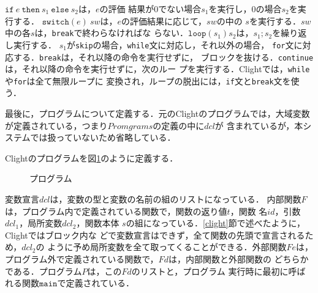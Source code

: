 $\texttt{if}\ e\ \texttt{then}\ s_{1}\ \texttt{else}\ s_{2}$は，$e$の評価
結果が$0$でない場合$s_{1}$を実行し，$0$の場合$s_2$を実行する．
$\texttt{switch}(e)\ sw$は，$e$の評価結果に応じて，$\mathit{sw}$の中の
$s$を実行する．$\mathit{sw}$中の各$s$は，\texttt{break}で終わらなければな
らない．$\texttt{loop}(s_{1}) s_{2}$は，$s_{1}; s_{2}$を繰り返し実行する．
$s_1$が\texttt{skip}の場合，\texttt{while}文に対応し，それ以外の場合，
\texttt{for}文に対応する．\texttt{break}は，それ以降の命令を実行せずに，
ブロックを抜ける．\texttt{continue}は，それ以降の命令を実行せずに，次のルー
プを実行する．Clightでは，\texttt{while}や\texttt{for}は全て無限ループに
変換され，ループの脱出には，\texttt{if}文と\texttt{break}文を使う．

最後に，プログラムについて定義する．元のClightのプログラムでは，大域変数
が定義されている，つまり$\mathit{Promgrams}$の定義の中に$\mathit{dcl}$が
含まれているが，本システムでは扱っていないため省略している．

\begin{definition}[プログラム]
  Clightのプログラムを図\ref{clight_program}のように定義する．
\end{definition}
\begin{figure}[htbp]
  \centering
  \caption{プログラム}
  \label{clight_program}
\end{figure}

変数宣言$\mathit{dcl}$は，変数の型と変数の名前の組のリストになっている．
内部関数$F$は，プログラム内で定義されている関数で，関数の返り値$t$，関数
名$\mathit{id}$，引数$\mathit{dcl}_1$，局所変数$\mathit{dcl}_2$，関数本体
$s$の組になっている．\ref{clight}節で述べたように，Clightではブロック内な
どで変数宣言はできず，全て関数の先頭で宣言されるため，$\mathit{dcl}_2$の
ように予め局所変数を全て取ってくることができる．外部関数$\mathit{Fe}$は，
プログラム外で定義されている関数で，$\mathit{Fd}$は，内部関数と外部関数の
どちらかである．プログラム$P$は，この$\mathit{Fd}$のリストと，プログラム
実行時に最初に呼ばれる関数$\texttt{main}$で定義されている．

